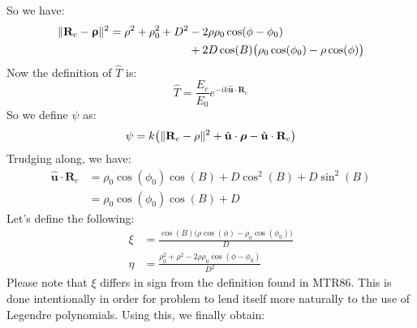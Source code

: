             So we have:
            \begin{equation}
                \begin{split}
                    \lVert\mathbf{R}_{c}-\boldsymbol{\uprho}\rVert^{2}
                    =\rho^{2}+\rho_{0}^{2}+D^{2}&-
                    2\rho\rho_{0}\cos(\phi-\phi_{0})
                    \\&+2D\cos(B)\big(\rho_{0}\cos(\phi_0)-
                    \rho\cos(\phi)\big)
                \end{split}
            \end{equation}
            Now the definition of $\hat{T}$ is:
            \begin{equation}
                \hat{T}=\frac{E_{c}}{E_{0}}
                e^{-ik\hat{\mathbf{u}}\cdot\mathbf{R}_{c}}
            \end{equation}
            So we define $\psi$ as:
            \begin{equation}
                \psi=
                k\big(\lVert\mathbf{R}_{c}-\rho\rVert^{2}+
                      \hat{\mathbf{u}}\cdot\boldsymbol{\rho}-
                      \hat{\mathbf{u}}\cdot\mathbf{R}_{c}\big)
            \end{equation}
            Trudging along, we have:
            \begin{subequations}
                \begin{align}
                    \hat{\mathbf{u}}\cdot\mathbf{R}_{c}
                    &=\rho_{0}\cos(\phi_0)\cos(B)+
                    D\cos^{2}(B)+D\sin^2(B)\\
                    &=\rho_{0}\cos(\phi_{0})\cos(B)+D
                \end{align}
            \end{subequations}
            Let's define the following:
            \begin{align}
                \xi&=\frac{\cos(B)\big(\rho\cos(\phi)-
                           \rho_{0}\cos(\phi_{0})\big)}
                          {D}\\
                \eta&=\frac{\rho_{0}^2+\rho^2-
                            2\rho\rho_{0}\cos(\phi-\phi_{0})}
                           {D^{2}}
            \end{align}
            Please note that $\xi$ differs in sign from
            the definition found in MTR86. This is done
            intentionally in order for problem to lend
            itself more naturally to the use of
            Legendre polynomials.
            Using this, we finally obtain:
